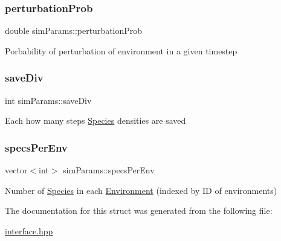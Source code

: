 \subsubsection{\texorpdfstring{perturbation\+Prob}{perturbationProb}}
{\footnotesize\ttfamily double sim\+Params\+::perturbation\+Prob}

Porbability of perturbation of environment in a given timestep \hypertarget{structsimParams_ad9fb5fcc3890d022270dbe00ec3a7c1e}{}\label{structsimParams_ad9fb5fcc3890d022270dbe00ec3a7c1e} 
\subsubsection{\texorpdfstring{save\+Div}{saveDiv}}
{\footnotesize\ttfamily int sim\+Params\+::save\+Div}

Each how many steps \hyperlink{classSpecies}{Species} densities are saved \hypertarget{structsimParams_aede5150c0b33bacae326638341a4e906}{}\label{structsimParams_aede5150c0b33bacae326638341a4e906} 
\subsubsection{\texorpdfstring{specs\+Per\+Env}{specsPerEnv}}
{\footnotesize\ttfamily vector$<$int$>$ sim\+Params\+::specs\+Per\+Env}

Number of \hyperlink{classSpecies}{Species} in each \hyperlink{classEnvironment}{Environment} (indexed by ID of environments) 

The documentation for this struct was generated from the following file\+:\begin{DoxyCompactItemize}
\item 
\hyperlink{interface_8hpp}{interface.\+hpp}\end{DoxyCompactItemize}
